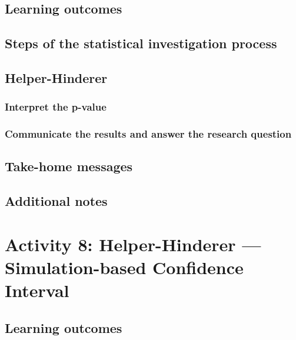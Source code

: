 \documentclass[
]{report}
\begin{document}
\subsection{Learning outcomes}\label{learning-outcomes-6}

\subsection{Steps of the statistical investigation process}\label{steps-of-the-statistical-investigation-process-3}

\subsection{Helper-Hinderer}\label{helper-hinderer-1}

\subsubsection*{Interpret the p-value}\label{interpret-the-p-value}

\subsubsection*{Communicate the results and answer the research question}\label{communicate-the-results-and-answer-the-research-question}

\subsection{Take-home messages}\label{take-home-messages-6}

\subsection{Additional notes}\label{additional-notes-6}

\section{Activity 8: Helper-Hinderer --- Simulation-based Confidence Interval}\label{activity-8-helper-hinderer-simulation-based-confidence-interval}

\subsection{Learning outcomes}\label{learning-outcomes-7}
\end{document}
